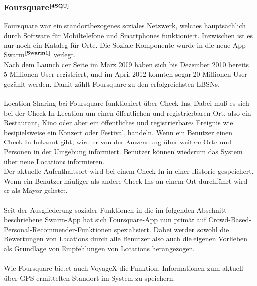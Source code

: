 \subsubsection[Foursquare]{Foursquare$^{\textbf{\ref{4SQU}}}$}
\addtocounter{footnote}{1}%
Foursquare war ein standortbezogenes soziales Netzwerk, welches hauptsächlich durch Software für Mobiltelefone und Smartphones funktioniert. Inzwischen ist es nur noch ein Katalog für Orte. Die Soziale Komponente wurde in die neue App Swarm$^{\textbf{\ref{Swarm1}}}$ verlegt.\cite{4SQ:WIKIDEF}\\
Nach dem Launch der Seite im März 2009 haben sich bis Dezember 2010 bereits 5 Millionen User registriert, und im April 2012 konnten sogar 20 Millionen User gezählt werden. Damit zählt Foursquare zu den erfolgreichsten LBSNs.\\ \\
Location-Sharing bei Foursquare funktioniert über Check-Ins. Dabei muß es sich bei der Check-In-Location um
einen öffentlichen und registrierbaren Ort, also ein Restaurant, Kino oder aber ein öffentliches und registrierbares Ereignis wie besipielsweise ein Konzert oder Festival, handeln.
Wenn ein Benutzer einen Check-In bekannt gibt, wird er von der Anwendung über weitere Orte und Personen in der Umgebung informiert. Benutzer können wiederum das System über neue Locations informieren.\\
Der aktuelle Aufenthaltsort wird bei einem Check-In in einer Historie gespeichert. Wenn 
ein Benutzer häufiger als andere Check-Ins an einem Ort durchführt wird er als Mayor gelistet.\\ \\
Seit der Ausgliederung sozialer Funktionen in die im folgenden Abschnitt beschriebene Swarm-App hat
sich Foursquare-App nun primär auf Crowd-Based-Personal-Recommender-Funktionen spezialisiert. Dabei werden sowohl die Bewertungen von Locations durch alle Benutzer also auch die eigenen Vorlieben als Grundlage
von Empfehlungen von Locations herangezogen.\\ \\
Wie Foursquare bietet auch VoyageX die Funktion, Informationen zum aktuell über GPS ermittelten Standort im System zu speichern.

